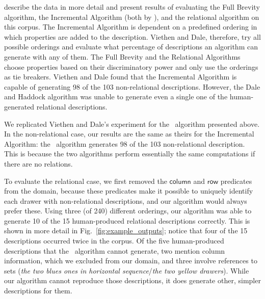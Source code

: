  describe the data in
more detail and present results of evaluating the Full Brevity
algorithm, the Incremental Algorithm (both by ), and
the relational algorithm \cite{dale91:_gener_refer_expres_invol_relat}
on this corpus. The Incremental Algorithm is dependent on a predefined
ordering in which properties are added to the description. Viethen and
Dale, therefore, try all possible orderings and evaluate what
percentage of descriptions an algorithm can generate with any of
them. The Full Brevity and the Relational Algorithms choose properties
based on their discriminatory power and only use the orderings as tie
breakers. Viethen and Dale found that the Incremental Algorithm is
capable of generating 98 of the 103 non-relational
descriptions. However, the Dale and Haddock algorithm was unable to
generate even a single one of the human-generated relational
descriptions.




We replicated Viethen and Dale's experiment for the \el\ algorithm
presented above. In the non-relational case, our results are the same
as theirs for the Incremental Algorithm: the \el\ algorithm generates
98 of the 103 non-relational description.  This is because the two
algorithms perform essentially the same computations if there are no
relations.


To evaluate the relational case, we first removed the
$\mathsf{column}$ and $\mathsf{row}$ predicates from the domain,
because these predicates make it possible to uniquely identify each
drawer with non-relational descriptions, and our algorithm would
always prefer these.  Using three (of 240) different orderings, our
algorithm was able to generate 10 of the 15 human-produced relational
descriptions correctly.  This is shown in more detail in
Fig.~\ref{fig:example_outputs}; notice that four of the 15
descriptions occurred twice in the corpus.  Of the five human-produced
descriptions that the \el\ algorithm cannot generate, two mention
column information, which we excluded from our domain, and three
involve references to sets (\textit{the two blues ones in horizontal
sequence}/\textit{the two yellow drawers}). While our algorithm cannot
reproduce those descriptions, it does generate other, simpler
descriptions for them.








